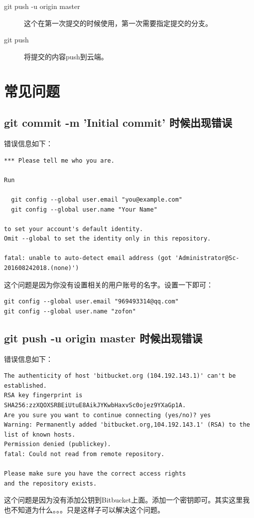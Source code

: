 \documentclass[a4paper,12pt]{ctexbook}
\begin{document}
\begin{flushleft}
\begin{description}
  \item[git push -u origin master] 这个在第一次提交的时候使用，第一次需要指定提交的分支。
  \item[git push] 将提交的内容push到云端。
\end{description}

\chapter{常见问题}
\section{git commit -m 'Initial commit' 时候出现错误}
错误信息如下：
\begin{verbatim}
*** Please tell me who you are.

Run

  git config --global user.email "you@example.com"
  git config --global user.name "Your Name"

to set your account's default identity.
Omit --global to set the identity only in this repository.

fatal: unable to auto-detect email address (got 'Administrator@Sc-201608242018.(none)')
\end{verbatim}
这个问题是因为你没有设置相关的用户账号的名字。设置一下即可：
\begin{verbatim}
git config --global user.email "969493314@qq.com"
git config --global user.name "zofon"
\end{verbatim}

\section{git push -u origin master 时候出现错误}
错误信息如下：
\begin{verbatim}
The authenticity of host 'bitbucket.org (104.192.143.1)' can't be established.
RSA key fingerprint is SHA256:zzXQOXSRBEiUtuE8AikJYKwbHaxvSc0ojez9YXaGp1A.
Are you sure you want to continue connecting (yes/no)? yes
Warning: Permanently added 'bitbucket.org,104.192.143.1' (RSA) to the list of known hosts.
Permission denied (publickey).
fatal: Could not read from remote repository.

Please make sure you have the correct access rights
and the repository exists.
\end{verbatim}
这个问题是因为没有添加公钥到Bitbucket上面。添加一个密钥即可。其实这里我也不知道为什么。。。只是这样子可以解决这个问题。


\end{flushleft}
\end{document}
